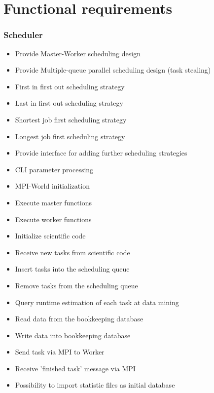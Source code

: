 {


\setcounter{func}{10}
\renewcommand{\labelitemi}{
	\ifnum \value{func}<10$/F 0\arabic{func} /$\addtocounter{func}{10}
	\else $/F \arabic{func} /$\addtocounter{func}{10}\fi
	}

\section{Functional requirements} 
	
	\subsubsection{Scheduler}
	
		\begin{itemize}
			\item Provide Master-Worker scheduling design 
			\item Provide Multiple-queue parallel scheduling design (task stealing)
			\item First in first out scheduling strategy
			\item Last in first out scheduling strategy
			\item Shortest job first scheduling strategy
			\item Longest job first scheduling strategy 
			\item Provide interface for adding further scheduling strategies
			\item CLI parameter processing
			\item MPI-World initialization
			\item Execute master functions
			\item Execute worker functions
			\item Initialize scientific code
			\item Receive new tasks from scientific code
			\item Insert tasks into the scheduling queue
			\item Remove tasks from the scheduling queue%
			\item Query runtime estimation of each task at data mining
			\item Read data from the bookkeeping database
			\item Write data into bookkeeping database
			\item Send task via MPI to Worker
			\item Receive 'finished task' message via MPI  
			\item Possibility to import statistic files as initial database
		\end{itemize}
	
}
